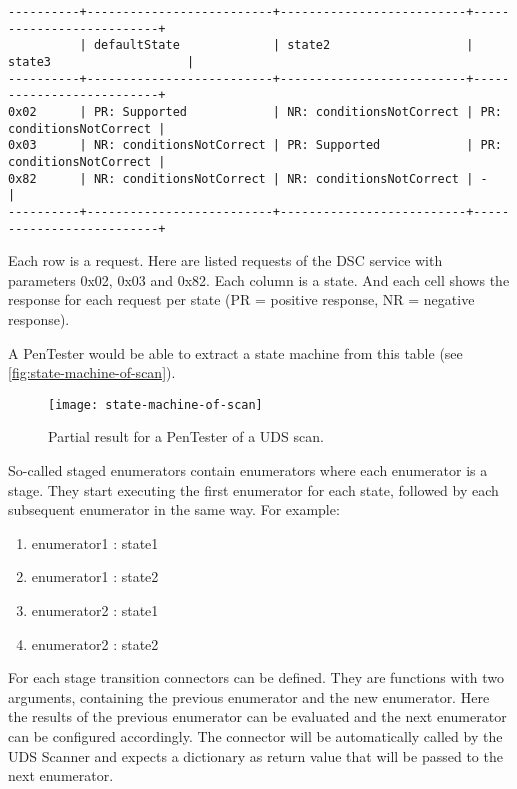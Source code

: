 \begin{samepage}
\begin{verbatim}
----------+--------------------------+--------------------------+--------------------------+
          | defaultState             | state2                   | state3                   | 
----------+--------------------------+--------------------------+--------------------------+
0x02      | PR: Supported            | NR: conditionsNotCorrect | PR: conditionsNotCorrect | 
0x03      | NR: conditionsNotCorrect | PR: Supported            | PR: conditionsNotCorrect | 
0x82      | NR: conditionsNotCorrect | NR: conditionsNotCorrect | -                        | 
----------+--------------------------+--------------------------+--------------------------+
\end{verbatim}
\end{samepage}

Each row is a request. Here are listed requests of the DSC service with parameters 0x02, 0x03 and 0x82. Each column is a state. And each cell shows the response for each request per state (PR = positive response, NR = negative response).

A PenTester would be able to extract a state machine from this table (see \autoref{fig:state-machine-of-scan}).

\begin{figure}[H]
    \centering
    \texttt{[image: state-machine-of-scan]}
    \caption{Partial result for a PenTester of a UDS scan.}
    \label{fig:state-machine-of-scan}
\end{figure}

So-called staged enumerators contain enumerators where each enumerator is a stage. They start executing the first enumerator for each state, followed by each subsequent enumerator in the same way. For example:
\begin{enumerate}
    \item enumerator1 : state1
    \item enumerator1 : state2
    \item enumerator2 : state1
    \item enumerator2 : state2
\end{enumerate}

For each stage transition connectors can be defined. They are functions with two arguments, containing the previous enumerator and the new enumerator. Here the results of the previous enumerator can be evaluated and the next enumerator can be configured accordingly. The connector will be automatically called by the UDS Scanner and expects a dictionary as return value that will be passed to the next enumerator. 

